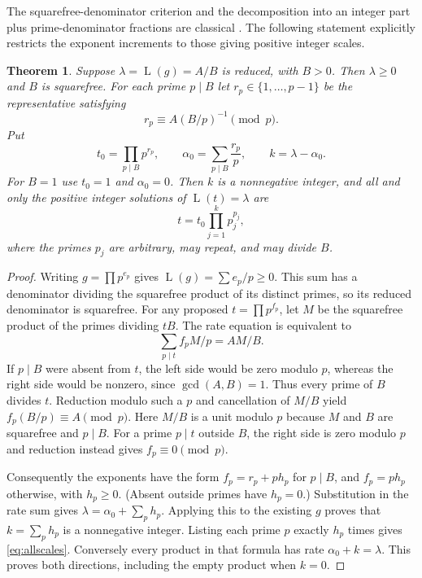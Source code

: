 \documentclass[11pt]{article}
\newcommand{\Lrate}{\operatorname{L}}
\newtheorem{theorem}{Theorem}[section]
\theoremstyle{definition}
\begin{document}
The squarefree-denominator criterion and the decomposition into an
integer part plus prime-denominator fractions are classical
\cite[Theorem 18]{ufnarovski}. The following statement explicitly
restricts the exponent increments to those giving positive integer scales.

\begin{theorem}\label{thm:residues}
Suppose $\lambda=\Lrate(g)=A/B$ is reduced, with $B>0$. Then
$\lambda\ge0$ and $B$ is squarefree. For each prime $p\mid B$ let
$r_p\in\{1,\ldots,p-1\}$ be the representative satisfying
\begin{equation}\label{eq:residue}
 r_p\equiv A(B/p)^{-1}\pmod p.
\end{equation}
Put
\begin{equation}\label{eq:core}
 t_0=\prod_{p\mid B}p^{r_p},\qquad
 \alpha_0=\sum_{p\mid B}\frac{r_p}{p},\qquad
 k=\lambda-\alpha_0.
\end{equation}
For $B=1$ use $t_0=1$ and $\alpha_0=0$. Then $k$ is a nonnegative
integer, and all and only the positive integer solutions of
$\Lrate(t)=\lambda$ are
\begin{equation}\label{eq:allscales}
 t=t_0\prod_{j=1}^{k}p_j^{p_j},
\end{equation}
where the primes $p_j$ are arbitrary, may repeat, and may divide $B$.
\end{theorem}
\begin{proof}
Writing $g=\prod p^{e_p}$ gives $\Lrate(g)=\sum e_p/p\ge0$.
This sum has a denominator dividing the squarefree product of its
distinct primes, so its reduced denominator is squarefree.
For any proposed $t=\prod p^{f_p}$, let $M$ be the squarefree product
of the primes dividing $tB$. The rate equation is equivalent to
\begin{equation}\label{eq:modular}
 \sum_{p\mid t}f_p M/p=A M/B.
\end{equation}
If $p\mid B$ were absent from $t$, the left side would be zero modulo
$p$, whereas the right side would be nonzero, since $\gcd(A,B)=1$.
Thus every prime of $B$ divides $t$. Reduction modulo such a $p$ and
cancellation of $M/B$ yield
$f_p(B/p)\equiv A\pmod p$. Here $M/B$ is a unit modulo $p$
because $M$ and $B$ are squarefree and $p\mid B$.
For a prime $p\mid t$ outside $B$, the
right side is zero modulo $p$ and reduction instead gives $f_p\equiv0
\pmod p$.

Consequently the exponents have the form
$f_p=r_p+ph_p$ for $p\mid B$, and $f_p=ph_p$ otherwise, with
$h_p\ge0$. (Absent outside primes have $h_p=0$.) Substitution in the
rate sum gives $\lambda=\alpha_0+\sum_p h_p$.
Applying this to the existing $g$ proves that $k=\sum_p h_p$ is a
nonnegative integer. Listing each prime $p$ exactly $h_p$ times gives
\eqref{eq:allscales}. Conversely every product in that formula has
rate $\alpha_0+k=\lambda$. This proves both directions, including
the empty product when $k=0$.
\end{proof}
\end{document}
